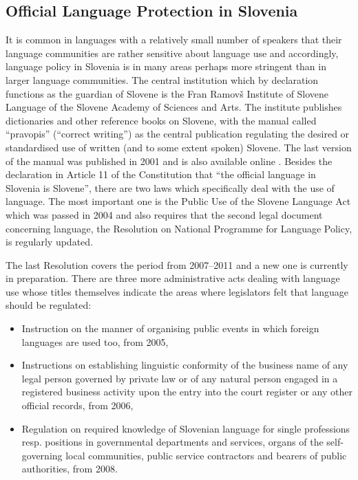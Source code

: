 \begin{multicols}{2}
\subsection{Official Language Protection in Slovenia}

It is common in languages with a relatively small number of speakers that their language communities are rather sensitive about language use and accordingly, language policy in Slovenia is in many areas perhaps more stringent than in larger language communities. The central institution which by declaration functions as the guardian of Slovene is the Fran Ramovš Institute of Slovene Language of the Slovene Academy of Sciences and Arts. The institute publishes dictionaries and other reference books on Slovene, with the manual called ``pravopis'' (``correct writing'') as the central publication regulating the desired or standardised use of written (and to some extent spoken) Slovene. The last version of the manual was published in 2001 and is also available online \cite{ISJFR1}.  Besides the declaration in Article 11 of the Constitution that ``the official language in Slovenia is Slovene'', there are two laws which specifically deal with the use of language. The most important one is the Public Use of the Slovene Language Act which was passed in 2004 and also requires that the second legal document concerning language, the Resolution on National Programme for Language Policy, is regularly updated.


The last Resolution covers the period from 2007--2011 and a new one is currently in preparation. There are three more administrative acts dealing with language use whose titles themselves indicate the areas where legislators felt that language should be regulated: 

\begin{itemize}
\item Instruction on the manner of organising public events in which foreign languages are used too, from 2005,
\item Instructions on establishing linguistic conformity of the business name of any legal person governed by private law or of any natural person engaged in a registered business activity upon the entry into the court register or any other official records, from 2006,
\item Regulation on required knowledge of Slovenian language for single professions resp. positions in governmental departments and services, organs of the self-governing local communities, public service contractors and bearers of public authorities, from 2008.
\end{itemize}  


\end{multicols}
